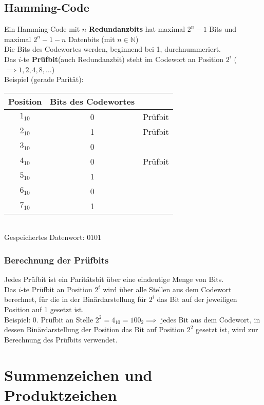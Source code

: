 \documentclass[12pt]{article}
\begin{document}
\subsection{Hamming-Code}
Ein Hamming-Code mit $n$ \textbf{Redundanzbits} hat maximal $2^n - 1$ Bits und maximal $2^n -1 - n$ Datenbits (mit $n \in \mathbb{N}$)\\
Die Bits des Codewortes werden, beginnend bei 1, durchnummeriert. \\
Das $i$-te \textbf{Prüfbit}(auch Redundanzbit) steht im Codewort an Position $2^i$ ($\implies 1,2,4,8,\dots$) \\
Beispiel (gerade Parität): \begin{tabular}{c|c c}
    Position & Bits des Codewortes & \\ \hline
    \cellcolor{lightgray}$1_{10}$ & \cellcolor{lightgray}0 & Prüfbit \\
    \cellcolor{lightgray}$2_{10}$ & \cellcolor{lightgray}1 & Prüfbit \\
    $3_{10}$ & 0 & \\
    \cellcolor{lightgray}$4_{10}$ & \cellcolor{lightgray}0 & Prüfbit \\
    $5_{10}$ & 1 & \\
    $6_{10}$ & 0 & \\
    $7_{10}$ & 1 & \\
\end{tabular} \\ Gespeichertes Datenwort: $0101$ \\
\subsubsection{Berechnung der Prüfbits}
Jedes Prüfbit ist ein Paritätsbit über eine eindeutige Menge von Bits. \\
Das $i$-te Prüfbit an Position $2^i$ wird über alle Stellen aus dem Codewort berechnet, für die in der Binärdarstellung für $2^i$ das Bit auf der jeweiligen Position auf 1 gesetzt ist. \\
Beispiel: 0. Prüfbit an Stelle $2^2 = 4_{10} = 100_2 \implies$ jedes Bit aus dem Codewort, in dessen Binärdarstellung der Position das Bit auf Position $2^2$ gesetzt ist, wird zur Berechnung des Prüfbits verwendet. \\ 

\newpage
\section{Summenzeichen und Produktzeichen}
\end{document}
